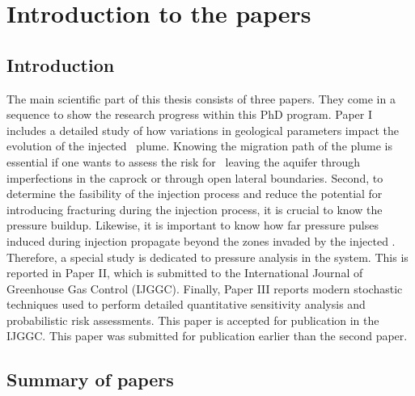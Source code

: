 \chapter{Introduction to the papers}

\pagebreak
\section{Introduction}

The main scientific part of this thesis consists of three papers. They come in a sequence to show the research progress within this PhD program. Paper I includes a detailed study of how variations in geological parameters impact the evolution of the injected \coo\ plume. Knowing the migration path of the plume is essential if one wants to assess  the risk for \coo\ leaving the aquifer through imperfections in the caprock or through open lateral boundaries. Second, to determine the fasibility of the injection process and reduce the potential for introducing fracturing during the injection process, it is crucial to know the pressure buildup. Likewise, it is important to know how far pressure pulses induced during injection propagate beyond the zones invaded by the injected \coo. Therefore, a special study is dedicated to pressure analysis in the system. This is reported in Paper II, which is submitted to the International Journal of Greenhouse Gas Control (IJGGC). Finally, Paper III reports modern stochastic techniques used to perform detailed quantitative sensitivity analysis and probabilistic risk assessments. This paper is accepted for publication in the IJGGC. This paper was submitted for publication earlier than the second paper.

\section{Summary of papers}

